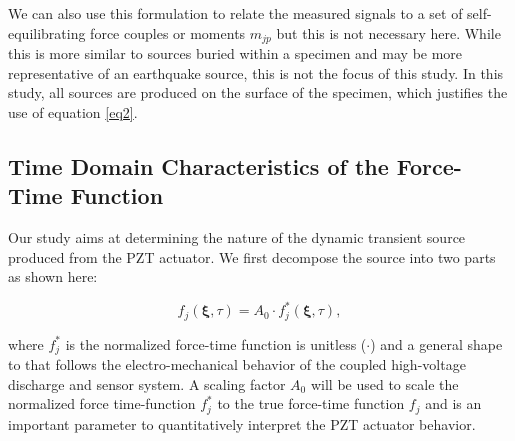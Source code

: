 \documentclass[preprint,3p, 11pt,authoryear]{elsarticle}
\begin{document}
\noindent We can also use this formulation to relate the measured signals to a set of self-equilibrating force couples or moments $m_{jp}$ \citep{Aki2002} but this is not necessary here. While this is more similar to sources buried within a specimen and may be more representative of an earthquake source, this is not the focus of this study.  In this study, all sources are produced on the surface of the specimen, which justifies the use of equation \eqref{eq2}.

\subsection{Time Domain Characteristics of the Force-Time Function}
\label{force_time}

Our study aims at determining the nature of the dynamic transient source produced from the PZT actuator. We first decompose the source into two parts as shown here:

\begin{equation}
    \label{eq4}
    f_{j}\left( \mathbf{\xi}, \tau \right) =A_{0} \cdot f^{*}_{j}\left( \mathbf{\xi}, \tau \right) ,
\end{equation}

\noindent where $f^{*}_{j}$ is the normalized force-time function is unitless ($\cdot$) and a general shape to that follows the electro-mechanical behavior of the coupled high-voltage discharge and sensor system.  A scaling factor $A_{0}$ will be used to scale the normalized force time-function $f_{j}^{*}$ to the true force-time function $f_{j}$ and is an important parameter to quantitatively interpret the PZT actuator behavior.
\end{document}
